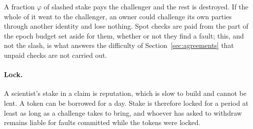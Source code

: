 A fraction $\varphi$ of slashed stake pays the challenger and the rest is destroyed. If the whole of it went to the
challenger, an owner could challenge its own parties through another identity and lose nothing. Spot checks are
paid from the part of the epoch budget set aside for them, whether or not they find a fault; this, and not the
slash, is what answers the difficulty of Section~\ref{sec:agreements} that unpaid checks are not carried out.

\paragraph{Lock.} A scientist's stake in a claim is reputation, which is slow to build and cannot be lent. A token
can be borrowed for a day. Stake is therefore locked for a period at least as long as a challenge takes to bring,
and whoever has asked to withdraw remains liable for faults committed while the tokens were locked.
